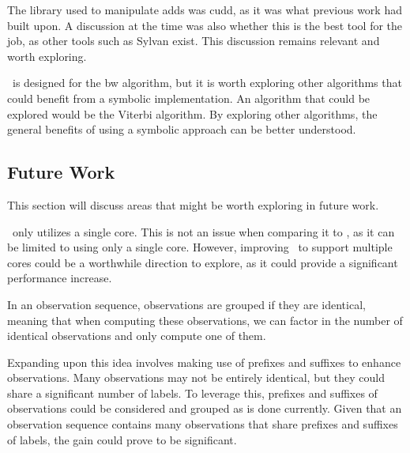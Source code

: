 The library used to manipulate \glspl{add} was \gls{cudd}, as it was what previous work had built upon.
A discussion at the time was also whether this is the best tool for the job, as other tools such as Sylvan exist.
This discussion remains relevant and worth exploring.

\Cupaal\ is designed for the \gls{bw} algorithm, but it is worth exploring other algorithms that could benefit from a symbolic implementation.
An algorithm that could be explored would be the Viterbi algorithm.
By exploring other algorithms, the general benefits of using a symbolic approach can be better understood.



\subsection{Future Work}\label{subsec:future_work}
This section will discuss areas that might be worth exploring in future work.

\Cupaal\ only utilizes a single core. This is not an issue when comparing it to \Jajapy, as it can be limited to using only a single core.
However, improving \Cupaal\ to support multiple cores could be a worthwhile direction to explore, as it could provide a significant performance increase.

In an observation sequence, observations are grouped if they are identical, meaning that when computing these observations, we can factor in the number of identical observations and only compute one of them.

Expanding upon this idea involves making use of prefixes and suffixes to enhance observations.
Many observations may not be entirely identical, but they could share a significant number of labels.
To leverage this, prefixes and suffixes of observations could be considered and grouped as is done currently.
Given that an observation sequence contains many observations that share prefixes and suffixes of labels, the gain could prove to be significant.

